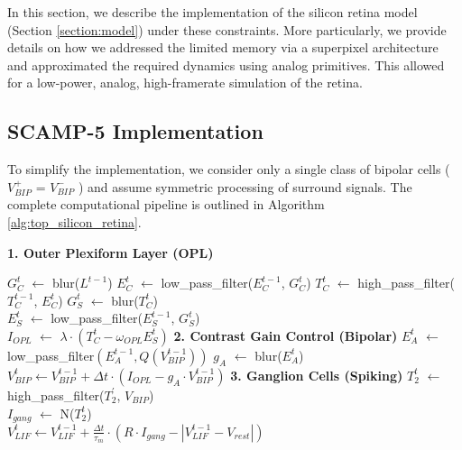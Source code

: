 \documentclass{article}
\begin{document}
In this section, we describe the implementation of the silicon retina model (Section \ref{section:model}) under these constraints. More particularly, we provide details on how we addressed the limited memory via a superpixel architecture and approximated the required dynamics using analog primitives. This allowed for a low-power, analog, high-framerate simulation of the retina.

\subsection{SCAMP-5 Implementation}
\label{section:implementation_strategy}

To simplify the implementation, we consider only a single class of bipolar cells ( $V_{BIP}^+$ = $V_{BIP}^-$ \cite{philip_neuromorphic_2025}) and assume symmetric processing of surround signals.  The complete computational pipeline is outlined in Algorithm \ref{alg:top_silicon_retina}.

\begin{algorithm}[H]
\caption{Silicon Retina Model on SCAMP-5}
\textbf{1. Outer Plexiform Layer (OPL)}\;

  $G_C^{t}$ $\leftarrow$ blur($L^{t-1}$) 
  $E_C^{t}$ $\leftarrow$ low\_pass\_filter($E_C^{t-1}$, $G_C^{t}$) 
  $T_C^{t}$ $\leftarrow$ high\_pass\_filter($T_C^{t-1}$, $E_C^{t}$) 
  $G_S^{t}$ $\leftarrow$ blur($T_C^{t}$) \\ 
  $E_S^{t}$ $\leftarrow$  low\_pass\_filter($E_S^{t-1}$, $G_S^{t}$) \\ 
  $I_{OPL}$ $\leftarrow$ $\lambda \cdot (T_C^{t} - \omega_{OPL} E_S^{t}) $ 
\textbf{2. Contrast Gain Control (Bipolar)}\;
  $E_A^{t}$ $\leftarrow$ low\_pass\_filter$(E_{A}^{t-1},Q(V_{BIP}^{t-1}))$  
  $g_A$ $\leftarrow$ blur($E_A^{t}$)  
  $V_{BIP}^{t} \leftarrow V_{BIP}^{t-1} + \Delta t \cdot (I_{OPL} -g_{A} \cdot V_{BIP}^{t-1})$ 
\textbf{3. Ganglion Cells (Spiking)}\;
$T_{2}^{t}$ $\leftarrow$ high\_pass\_filter($T_{2}^{'}$, $V_{BIP}$) \\ 
  $I_{gang}$ $\leftarrow$ N($T_{2}^{t}$) \\ 
  $V_{LIF}^t \leftarrow V_{LIF}^{t-1} + \frac{\Delta t}{\tau_m} \cdot (R \cdot I_{gang} - |V_{LIF}^{t-1} - V_{rest}|)$ 
  
  \label{alg:top_silicon_retina}
\end{algorithm}
\end{document}
